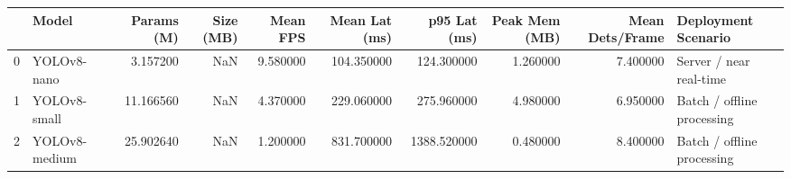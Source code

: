 \begin{tabular}{llrrrrrrrl}
\toprule
 & Model & Params (M) & Size (MB) & Mean FPS & Mean Lat (ms) & p95 Lat (ms) & Peak Mem (MB) & Mean Dets/Frame & Deployment Scenario \\
\midrule
0 & YOLOv8-nano & 3.157200 & NaN & 9.580000 & 104.350000 & 124.300000 & 1.260000 & 7.400000 & Server / near real-time \\
1 & YOLOv8-small & 11.166560 & NaN & 4.370000 & 229.060000 & 275.960000 & 4.980000 & 6.950000 & Batch / offline processing \\
2 & YOLOv8-medium & 25.902640 & NaN & 1.200000 & 831.700000 & 1388.520000 & 0.480000 & 8.400000 & Batch / offline processing \\
\bottomrule
\end{tabular}
